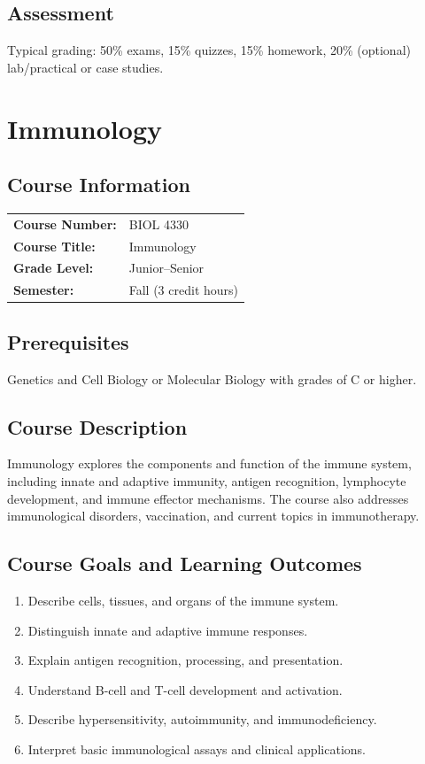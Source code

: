 \documentclass[12pt,oneside]{book}
\begin{document}
\section{Assessment}

Typical grading: 50\% exams, 15\% quizzes, 15\% homework, 20\% (optional) lab/practical or case studies.


\chapter{Immunology}

\section{Course Information}

\begin{tabular}{ll}
\textbf{Course Number:} & BIOL 4330 \\
\textbf{Course Title:} & Immunology \\
\textbf{Grade Level:} & Junior--Senior \\
\textbf{Semester:} & Fall (3 credit hours) \\
\end{tabular}

\section{Prerequisites}

Genetics and Cell Biology or Molecular Biology with grades of C or higher.

\section{Course Description}

Immunology explores the components and function of the immune system, including innate and adaptive immunity, antigen recognition, lymphocyte development, and immune effector mechanisms. The course also addresses immunological disorders, vaccination, and current topics in immunotherapy.

\section{Course Goals and Learning Outcomes}

\begin{enumerate}
    \item Describe cells, tissues, and organs of the immune system.
    \item Distinguish innate and adaptive immune responses.
    \item Explain antigen recognition, processing, and presentation.
    \item Understand B-cell and T-cell development and activation.
    \item Describe hypersensitivity, autoimmunity, and immunodeficiency.
    \item Interpret basic immunological assays and clinical applications.
\end{enumerate}
\end{document}
